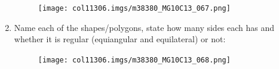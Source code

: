 \begin{table}[H]
\begin{enumerate}[noitemsep, label=\textbf{\arabic*}. ]
          
    \setcounter{subfigure}{0}


	\begin{figure}[H] %
    \begin{center}
    \label{m38380*id401232!!!underscore!!!media}\label{m38380*id401232!!!underscore!!!printimage}\texttt{[image: col11306.imgs/m38380\_MG10C13\_067.png]} %
        
    
    \end{center}

 \end{figure}   

    \addtocounter{footnote}{-0}
 \pagebreak   
        
\label{m38380*uid141}\item Name each of the shapes/polygons, state how many sides each has and whether it is regular (equiangular and equilateral) or not:

          
    \setcounter{subfigure}{0}


	\begin{figure}[H] %
    \begin{center}
    \label{m38380*id401233!!!underscore!!!media}\label{m38380*id401233!!!underscore!!!printimage}\texttt{[image: col11306.imgs/m38380\_MG10C13\_068.png]} %
        
    
    \end{center}

 \end{figure}   

    \addtocounter{footnote}{-0}
    

\end{enumerate}
\end{table}
